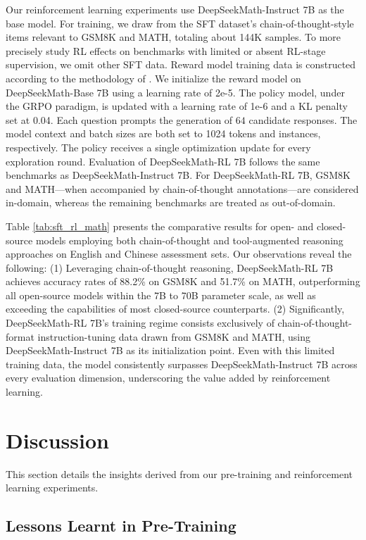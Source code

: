 Our reinforcement learning experiments use DeepSeekMath-Instruct 7B as the base model. For training, we draw from the SFT dataset's chain-of-thought-style items relevant to GSM8K and MATH, totaling about 144K samples. To more precisely study RL effects on benchmarks with limited or absent RL-stage supervision, we omit other SFT data. Reward model training data is constructed according to the methodology of \citep{wang2023math}. We initialize the reward model on DeepSeekMath-Base 7B using a learning rate of 2e-5. The policy model, under the GRPO paradigm, is updated with a learning rate of 1e-6 and a KL penalty set at 0.04. Each question prompts the generation of $64$ candidate responses. The model context and batch sizes are both set to 1024 tokens and instances, respectively. The policy receives a single optimization update for every exploration round. Evaluation of DeepSeekMath-RL 7B follows the same benchmarks as DeepSeekMath-Instruct 7B. For DeepSeekMath-RL 7B, GSM8K and MATH—when accompanied by chain-of-thought annotations—are considered in-domain, whereas the remaining benchmarks are treated as out-of-domain.

Table \ref{tab:sft_rl_math} presents the comparative results for open- and closed-source models employing both chain-of-thought and tool-augmented reasoning approaches on English and Chinese assessment sets. Our observations reveal the following: (1) Leveraging chain-of-thought reasoning, DeepSeekMath-RL 7B achieves accuracy rates of 88.2\% on GSM8K and 51.7\% on MATH, outperforming all open-source models within the 7B to 70B parameter scale, as well as exceeding the capabilities of most closed-source counterparts. (2) Significantly, DeepSeekMath-RL 7B's training regime consists exclusively of chain-of-thought-format instruction-tuning data drawn from GSM8K and MATH, using DeepSeekMath-Instruct 7B as its initialization point. Even with this limited training data, the model consistently surpasses DeepSeekMath-Instruct 7B across every evaluation dimension, underscoring the value added by reinforcement learning.

\section{Discussion}
This section details the insights derived from our pre-training and reinforcement learning experiments.

\subsection{Lessons Learnt in Pre-Training}

